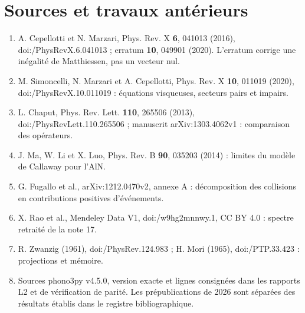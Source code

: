 \documentclass[11pt,a4paper]{article}
\begin{document}
\section{Sources et travaux antérieurs}
\begin{enumerate}
\item A. Cepellotti et N. Marzari, Phys. Rev. X \textbf{6}, 041013 (2016), doi:/PhysRevX.6.041013 ; erratum \textbf{10}, 049901 (2020). L'erratum corrige une inégalité de Matthiessen, pas un vecteur nul.
\item M. Simoncelli, N. Marzari et A. Cepellotti, Phys. Rev. X \textbf{10}, 011019 (2020), doi:/PhysRevX.10.011019 : équations visqueuses, secteurs pairs et impairs.
\item L. Chaput, Phys. Rev. Lett. \textbf{110}, 265506 (2013), doi:/PhysRevLett.110.265506 ; manuscrit arXiv:1303.4062v1 : comparaison des opérateurs.
\item J. Ma, W. Li et X. Luo, Phys. Rev. B \textbf{90}, 035203 (2014) : limites du modèle de Callaway pour l'AlN.
\item G. Fugallo et al., arXiv:1212.0470v2, annexe A : décomposition des collisions en contributions positives d'événements.
\item X. Rao et al., Mendeley Data V1, doi:/w9hg2mnnwy.1, CC BY 4.0 : spectre retraité de la note 17.
\item R. Zwanzig (1961), doi:/PhysRev.124.983 ; H. Mori (1965), doi:/PTP.33.423 : projections et mémoire.
\item Sources phono3py v4.5.0, version exacte et lignes consignées dans les rapports L2 et de vérification de parité. Les prépublications de 2026 sont séparées des résultats établis dans le registre bibliographique.
\end{enumerate}
\end{document}
